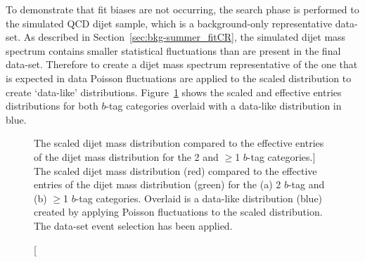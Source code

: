 To demonstrate that fit biases are not occurring,
the search phase is performed to the simulated QCD dijet sample,
which is a background-only representative data-set. 
As described in Section~\ref{sec:bkg-summer_fitCR},
the simulated dijet mass spectrum contains smaller statistical fluctuations than are present in the final data-set.
Therefore to create a dijet mass spectrum representative of the one that is expected in data 
Poisson fluctuations are applied to the scaled distribution to create `data-like' distributions.
Figure~\ref{fig:effEntDataLike} shows the scaled and effective entries distributions for both
$b$-tag categories overlaid with a data-like distribution in blue.

\begin{figure}[!ht]
  \begin{center}
   \captionsetup[subfigure]{aboveskip=0pt,justification=centering}
  \end{center}
  \vspace{-1em}
  \caption
      [The scaled dijet mass distribution compared to the
        effective entries of the dijet mass distribution 
        for the 2 and $\geq$1 $b$-tag categories.]
      {The scaled dijet mass distribution (red) compared to the
        effective entries of the dijet mass distribution (green)
        for the (a) 2 $b$-tag and (b) $\geq$1 $b$-tag categories.
        Overlaid is a data-like distribution (blue) created by applying Poisson fluctuations to the scaled distribution.
        The \summer{} data-set event selection has been applied.}
  \label{fig:effEntDataLike}
\end{figure}

